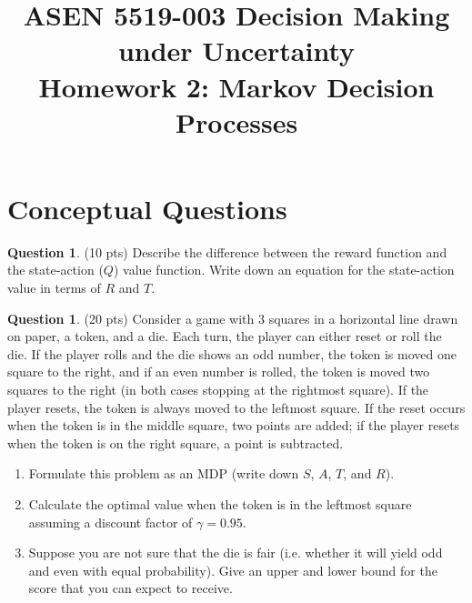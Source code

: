 \documentclass{article}
\title{ASEN 5519-003 Decision Making under Uncertainty\\
       Homework 2: Markov Decision Processes}
\theoremstyle{definition}
\newtheorem{question}[thm]{Question}
\begin{document}
\maketitle

\section{Conceptual Questions}

\begin{question} (10 pts)
    Describe the difference between the reward function and the state-action ($Q$) value function. Write down an equation for the state-action value in terms of $R$ and $T$.
\end{question}

\begin{question} (20 pts)
    Consider a game with 3 squares in a horizontal line drawn on paper, a token, and a die. Each turn, the player can either reset or roll the die. If the player rolls and the die shows an odd number, the token is moved one square to the right, and if an even number is rolled, the token is moved two squares to the right (in both cases stopping at the rightmost square). If the player resets, the token is always moved to the leftmost square. If the reset occurs when the token is in the middle square, two points are added; if the player resets when the token is on the right square, a point is subtracted.
    \begin{enumerate}[label=\alph*)]
        \item Formulate this problem as an MDP (write down $S$, $A$, $T$, and $R$).
        \item Calculate the optimal value when the token is in the leftmost square assuming a discount factor of $\gamma = 0.95$.
        \item Suppose you are not sure that the die is fair (i.e. whether it will yield odd and even with equal probability). Give an upper and lower bound for the score that you can expect to receive.
    \end{enumerate}
\end{question}
\end{document}
